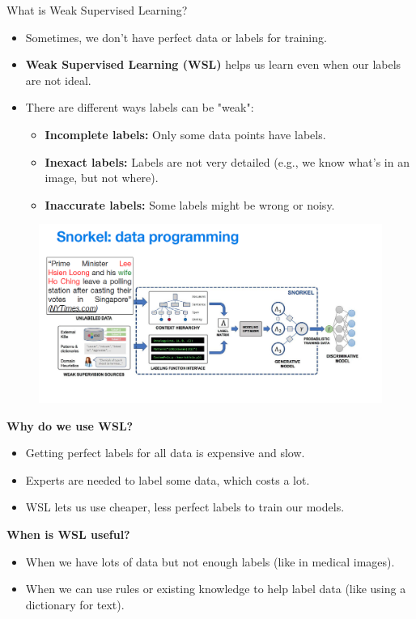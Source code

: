 \begin{frame}[allowframebreaks]{What is Weak Supervised Learning?}
    \begin{itemize}
        \item Sometimes, we don't have perfect data or labels for training.
        \item \textbf{Weak Supervised Learning (WSL)} helps us learn even when our labels are not ideal.
        \item There are different ways labels can be "weak":
        \begin{itemize}
            \item \textbf{Incomplete labels:} Only some data points have labels.
            \item \textbf{Inexact labels:} Labels are not very detailed (e.g., we know what’s in an image, but not where).
            \item \textbf{Inaccurate labels:} Some labels might be wrong or noisy.
        \end{itemize}
    \end{itemize}

    \framebreak
    \begin{figure}
        \centering
        \includegraphics[width=1.05\linewidth,height=0.95\textheight,keepaspectratio]{images/contrastive/snorkel.png}
    \end{figure}

    \framebreak
    \textbf{Why do we use WSL?}
    \begin{itemize}
        \item Getting perfect labels for all data is expensive and slow.
        \item Experts are needed to label some data, which costs a lot.
        \item WSL lets us use cheaper, less perfect labels to train our models.
    \end{itemize}

    \framebreak
    \textbf{When is WSL useful?}
    \begin{itemize}
        \item When we have lots of data but not enough labels (like in medical images).
        \item When we can use rules or existing knowledge to help label data (like using a dictionary for text).
    \end{itemize}
\end{frame}

